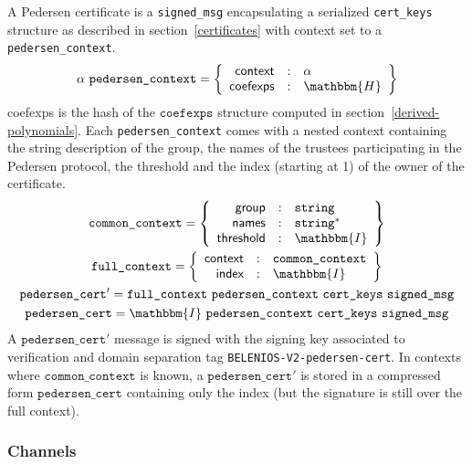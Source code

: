\documentclass[a4paper]{article}
\newcommand{\dstprefix}{BELENIOS-V2}
\newcommand{\hash}{\mathbbm{H}}
\newcommand{\I}{\mathbbm{I}}
\newcommand{\jstring}{\texttt{string}}
\begin{document}
A Pedersen certificate is a \texttt{signed\_msg} encapsulating a
serialized \texttt{cert\_keys} structure as described in
section~\ref{certificates} with \textsf{context} set to a
\texttt{pedersen\_context}.
\begin{gather*}
  \alpha\ \texttt{pedersen\_context} =\left\{
    \begin{array}{rcl}
      \textsf{context}&:&\alpha\\
      \textsf{coefexps}&:&\hash
    \end{array}
  \right\}
\end{gather*}
\textsf{coefexps} is the hash of the $\texttt{coefexps}$ structure
computed in section~\ref{derived-polynomials}. Each
\texttt{pedersen\_context} comes with a nested \textsf{context}
containing the string description of the group, the names of the
trustees participating in the Pedersen protocol, the threshold and the
index (starting at 1) of the owner of the certificate.
\begin{gather*}
  \texttt{common\_context}=\left\{
    \begin{array}{rcl}
      \textsf{group}&:&\jstring\\
      \textsf{names}&:&\jstring^\ast\\
      \textsf{threshold}&:&\I
    \end{array}
  \right\}\\
  \texttt{full\_context}=\left\{
    \begin{array}{rcl}
      \textsf{context}&:&\texttt{common\_context}\\
      \textsf{index}&:&\I
    \end{array}
  \right\}\\
  \texttt{pedersen\_cert}'=\texttt{full\_context}\ \texttt{pedersen\_context}\ \texttt{cert\_keys}\ \texttt{signed\_msg}\\
  \texttt{pedersen\_cert}=\I\ \texttt{pedersen\_context}\ \texttt{cert\_keys}\ \texttt{signed\_msg}
\end{gather*}
A $\texttt{pedersen\_cert}'$ message is signed with the signing key
associated to \textsf{verification} and domain separation tag
\texttt{\dstprefix-pedersen-cert}. In contexts where
$\texttt{common\_context}$ is known, a $\texttt{pedersen\_cert}'$ is
stored in a compressed form $\texttt{pedersen\_cert}$ containing only
the index (but the signature is still over the full context).

\subsubsection{Channels}
\label{channels}
\end{document}
